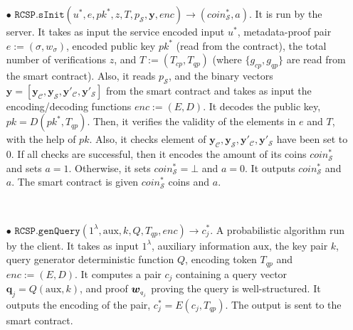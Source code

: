 \begin{definition}[RC-S-P Scheme]
\begin{itemize}
\

\item[$\bullet$] $\mathtt{RCSP}.\mathtt{sInit}(u^{\scriptscriptstyle *},e, pk^{\scriptscriptstyle *},z, T, p_{\scriptscriptstyle\mathcal S},\bm{y},enc)\rightarrow (coin^{\scriptscriptstyle *}_{\scriptscriptstyle\mathcal S},a)$. It is  run by the server. It takes as input the  service encoded input $u^{\scriptscriptstyle *}$, metadata-proof pair $e:=(\sigma,w_{\scriptscriptstyle\sigma})$,  encoded public key $pk^{\scriptscriptstyle *}$ (read from the contract), the total number of verifications $z$, and $T:=(T_{\scriptscriptstyle cp},T_{\scriptscriptstyle qp})$ (where $\{g_{\scriptscriptstyle cp},  g_{\scriptscriptstyle qp}\}$ are read from the smart contract). Also, it reads $p_{\scriptscriptstyle\mathcal S}$, and the  binary vectors $\bm{y}=[\bm{y}_{\scriptscriptstyle \mathcal  C}, \bm{y}_{\scriptscriptstyle \mathcal  S},\bm{y}'_{\scriptscriptstyle \mathcal  C}, \bm{y}'_{\scriptscriptstyle \mathcal  S}]$ from the smart contract and takes as input the encoding/decoding functions $enc:=(E,D)$. It decodes the public key, $pk=D(pk^{\scriptscriptstyle*}, T_{\scriptscriptstyle qp})$. Then, it verifies the validity of the elements in $e$ and  $T$, with the help of $pk$. Also, it checks element of $\bm{y}_{\scriptscriptstyle \mathcal  C}, \bm{y}_{\scriptscriptstyle \mathcal  S},\bm{y}'_{\scriptscriptstyle \mathcal  C}, \bm{y}'_{\scriptscriptstyle \mathcal  S}$ have been set to $0$. If all checks are successful, then it encodes the amount of its coins  $coin^{\scriptscriptstyle*}_{\scriptscriptstyle\mathcal S}$ and sets $a=1$. Otherwise, it sets $coin^{\scriptscriptstyle *}_{\scriptscriptstyle\mathcal S}=\bot$ and $a=0$. It outputs $coin^{\scriptscriptstyle *}_{\scriptscriptstyle\mathcal S}$ and $a$. The smart contract is given $coin^{\scriptscriptstyle *}_{\scriptscriptstyle\mathcal S}$ coins and $a$.  

\

\item[$\bullet$] $\mathtt{RCSP}.\mathtt{genQuery}(1^\lambda, \text{aux},k,Q, T_{\scriptscriptstyle qp}, enc)\rightarrow c^{\scriptscriptstyle *}_{\scriptscriptstyle j}$. A probabilistic algorithm run by the client. It takes as input  $1^\lambda$,  auxiliary information $\text{aux}$,  the key pair $k$,   query generator deterministic function $Q$, encoding token $T_{\scriptscriptstyle qp}$ and $enc:=(E,D)$.  It computes a pair $c_{\scriptscriptstyle j}$ containing a query vector $\bm{q}_{\scriptscriptstyle j}=Q( \text{aux},k)$,  and proof $\bm{w}_{\scriptscriptstyle q_{_{\scaleto{j}{\size}}}}$ proving the query is well-structured. It outputs the encoding of the pair, $c^{\scriptscriptstyle *}_{\scriptscriptstyle j}=E(c_{\scriptscriptstyle j},T_{\scriptscriptstyle qp})$. The output is sent to the smart contract. 


\end{itemize}
\end{definition}
